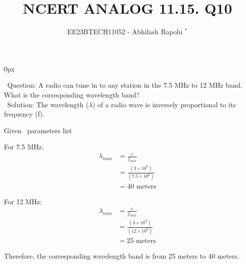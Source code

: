 \documentclass[journal,12pt,twocolumn]{IEEEtran}
\begin{document}


\vspace{3cm}
\title{NCERT ANALOG 11.15. Q10}
\author{EE23BTECH11052 - Abhilash Rapolu $^{*}$%
}
\maketitle

\newpage
\bigskip
\renewcommand{\thetable}{\arabic{table}}

\parindent 0px

\ Question:
A radio can tune in to any station in the 7.5 MHz to 12 MHz band. What is the corresponding wavelength band?\\
\ Solution:
The wavelength ($\lambda$) of a radio wave is inversely proportional to its frequency (f).

\begin{table}[htbp] \small
\centering

\caption{Given \, parameters list}
\end{table}

For 7.5 MHz:
\begin{align}
\lambda_{max} &= \frac{c}{f_{min}} \\
&= \frac{(3\times10^{8})}{(7.5\times10^{6})} \\
&= 40 \text{ meters}
\end{align}

For 12 MHz:
\begin{align}
\lambda_{min} &= \frac{c}{f_{max}} \\
&= \frac{(3\times10^{8})}{(12\times10^{6})} \\
&= 25 \text{ meters}
\end{align}

Therefore, the corresponding wavelength band is from 25 meters to 40 meters.
\end{document}
